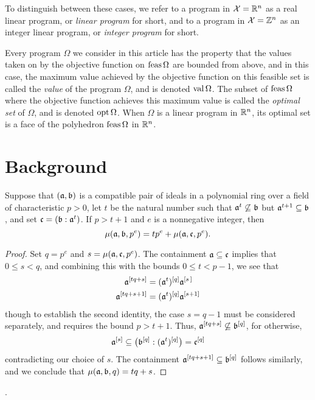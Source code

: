 \documentclass{amsart}
\begin{document}
To distinguish between these cases, we refer to a program in $\mathcal{X} = \mathbb{R}^n$ as a {real linear program}, or \emph{linear program} for short, and to a program in $\mathcal{X}=\mathbb{Z}^n$ as an {integer linear program}, or \emph{integer program} for short.

Every program $\Omega$ we consider in this article has the property that the values taken on by the objective function on $\operatorname{feas} \Omega$ are bounded from above, and in this case, the maximum value achieved by the objective function on this feasible set is called the \emph{value} of the program $\Omega$, and is denoted $\operatorname{val} \Omega$.  The subset of $\operatorname{feas} \Omega$ where the objective function achieves this maximum value is called the \emph{optimal set} of $\Omega$, and is denoted $\operatorname{opt} \Omega$.   When $\Omega$ is a linear program in $\mathbb{R}^n$, its optimal set is a face of the polyhedron $\operatorname{feas} \Omega$ in $\mathbb{R}^n$.

\section{Background}
\label{background: S}

\begin{lemma} 
\label{compatible to small compatible: L}
 Suppose that $(\mathfrak{a}, \mathfrak{b})$ is a compatible pair of ideals in a polynomial ring over a field of characteristic $p>0$, let $t$ be the natural number such that $\mathfrak{a}^t \not \subseteq \mathfrak{b}$ but $\mathfrak{a}^{t+1} \subseteq \mathfrak{b}$, and set $\mathfrak{c} = (\mathfrak{b} : \mathfrak{a}^t)$.   If $p > t+1$ and $e$ is a nonnegative integer, then
\[ \mu(\mathfrak{a}, \mathfrak{b}, p^e) = t p^e + \mu(\mathfrak{a}, \mathfrak{c}, p^e). \] 
\end{lemma}

\begin{proof}  Set $q=p^e$ and $s=\mu(\mathfrak{a}, \mathfrak{c}, p^e)$.  The containment $\mathfrak{a} \subseteq \mathfrak{c}$ implies that $0 \leq s < q$, and combining this with the bounds $0 \le t < p-1$, we see that 
%
\begin{align*}
\mathfrak{a}^{[tq+s]} & = (\mathfrak{a}^t)^{[q]} \mathfrak{a}^{[s \, ]} \\ 
 \mathfrak{a}^{[tq+s+1]} & = (\mathfrak{a}^t)^{[q]} \mathfrak{a}^{[s+1]}
\end{align*}
%
though to establish the second identity, the case $s=q-1$ must be considered separately, and requires the bound $p>t+1$.  Thus, $\mathfrak{a}^{[tq+s]} \not \subseteq \mathfrak{b}^{[q]}$, for otherwise, \[ \mathfrak{a}^{[s]} \subseteq \big(\mathfrak{b}^{[q]} : (\mathfrak{a}^t)^{[q]}\big) = \mathfrak{c}^{[q]}\]  contradicting our choice of $s$.  The containment $\mathfrak{a}^{[tq+s+1]} \subseteq \mathfrak{b}^{[q]}$ follows similarly, and we conclude that $\mu(\mathfrak{a},\mathfrak{b},q) = tq + s$. 
\end{proof}.
\end{document}
